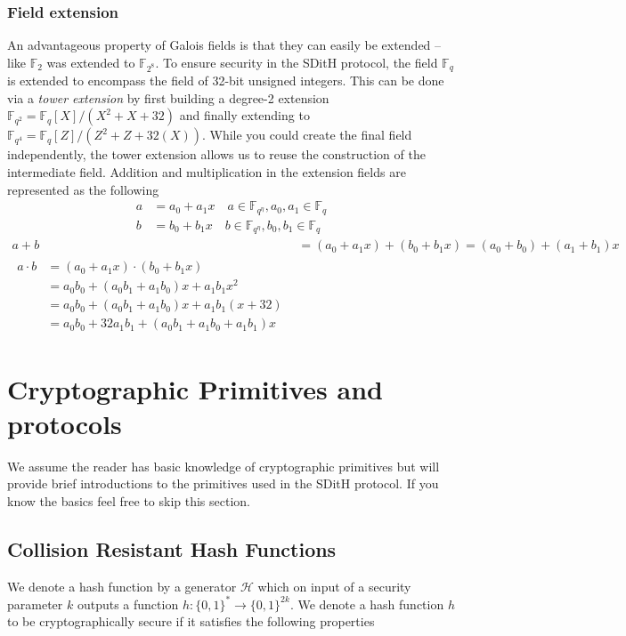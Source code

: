 \documentclass[11pt]{report}
\theoremstyle{definition}
\theoremstyle{plain}
\begin{document}
\subsubsection{Field extension}\label{sub:field_extension}

An advantageous property of Galois fields is that they can easily be extended -- like $\mathbb{F}_{2}$ was extended to $\mathbb{F}_{2^8}$. To ensure security in the SDitH protocol, the field $\mathbb{F}_q$ is extended to encompass the field of 32-bit unsigned integers. This can be done via a \textit{tower extension} by first building a degree-2 extension $\mathbb{F}_{q^2} = \mathbb{F}_q[X] / (X^2 + X + 32)$ and finally extending to $\mathbb{F}_{q^4} = \mathbb{F}_q[Z] / (Z^2 + Z + 32(X))$. While you could create the final field independently, the tower extension allows us to reuse the construction of the intermediate field. Addition and multiplication in the extension fields are represented as the following
\begin{align*}
  a & = a_0 + a_1x  \quad a \in \mathbb{F}_{q^\eta}, a_0, a_1 \in \mathbb{F}_q \\
  b & = b_0 + b_1x  \quad b \in \mathbb{F}_{q^\eta}, b_0, b_1 \in \mathbb{F}_q
\end{align*}
\begin{align}
  a + b & = (a_0 + a_1x) + (b_0 + b_1x) = (a_0 + b_0) + (a_1 + b_1)x \\
  \begin{split}
    a \cdot b & = (a_0 + a_1x) \cdot (b_0 + b_1x)                                         \\
    & = a_0b_0 + (a_0b_1 + a_1b_0)x + a_1b_1x^2                                 \\
    & = a_0b_0 + (a_0b_1 + a_1b_0)x + a_1b_1(x + 32)                            \\
    & = a_0b_0 + 32a_1b_1 + (a_0b_1 + a_1b_0 + a_1b_1)x
  \end{split}
\end{align}

\section{Cryptographic Primitives and protocols}
We assume the reader has basic knowledge of cryptographic primitives but will provide brief introductions to the primitives used in the SDitH protocol. If you know the basics feel free to skip this section.

\subsection{Collision Resistant Hash Functions}\label{sec:prelim_hash}
We denote a hash function by a generator $\mathcal{H}$ which on input of a security parameter $k$ outputs a function $h : \{0,1{\}}^* \rightarrow \{0,1{\}}^{2k}$. We denote a hash function $h$ to be cryptographically secure if it satisfies the following properties
\end{document}
